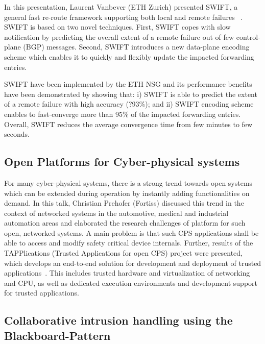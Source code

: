 In this presentation, Laurent Vanbever (ETH Zurich) presented SWIFT, a general
fast re-route framework supporting both local and remote failures~\cite{} .
SWIFT is based on two novel techniques. First, SWIFT copes with slow
notification by predicting the overall extent of a remote failure out of few
control-plane (BGP) messages. Second, SWIFT introduces a new data-plane
encoding scheme which enables it to quickly and flexibly update the impacted
forwarding entries.

SWIFT have been implemented by the ETH \ac{NSG} and its performance benefits
have been demonstrated by showing that: i) SWIFT is able to predict the extent
of a remote failure with high accuracy (?93\%); and ii) SWIFT encoding scheme
enables to fast-converge more than 95\% of the impacted forwarding entries.
Overall, SWIFT reduces the average convergence time from few minutes to few
seconds.


\subsection{Open Platforms for Cyber-physical systems}

For many cyber-physical systems, there is a strong trend towards open systems
which can be extended during operation by instantly adding functionalities on
demand. In this talk, Christian Prehofer (Fortiss) discussed this trend in the
context of networked systems in the automotive, medical and industrial
automation areas and elaborated the research challenges of platform for such
open, networked systems. A main problem is that such CPS applications shall be able to
access and modify safety critical device internals. Further, results of the
TAPPlications (Trusted Applications for open CPS) project were presented, which  develops an
end-to-end solution for development and deployment of trusted
applications~\cite{prehofer:eitec:2016}. This includes trusted hardware and
virtualization of networking and CPU, as well as dedicated execution
environments and development support for trusted applications.


\subsection{Collaborative intrusion handling using the Blackboard-Pattern}

